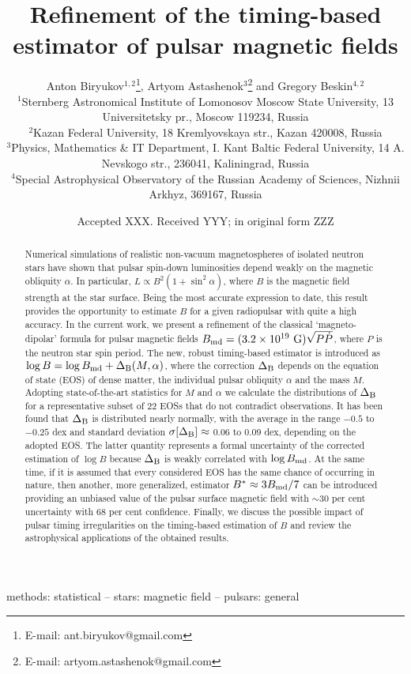 \documentclass[fleqn,usenatbib]{mnras}
\title[Refinement of pulsar magnetic fields]{Refinement of the timing-based estimator of pulsar magnetic fields}
\author[Biryukov, Astashenok \& Beskin]{
Anton Biryukov$^{1,2}$\thanks{E-mail: ant.biryukov@gmail.com},
Artyom Astashenok$^{3}$\thanks{E-mail:
artyom.astashenok@gmail.com} and
Gregory Beskin$^{4,2}$
\\
$^{1}$Sternberg Astronomical Institute of Lomonosov Moscow State University, 13 Universitetsky pr., Moscow 119234, Russia \\
$^{2}$Kazan Federal University, 18 Kremlyovskaya str., Kazan 420008, Russia \\
$^{3}$Physics, Mathematics \& IT Department, I. Kant Baltic Federal University, 14 A. Nevskogo str., 236041, Kaliningrad, Russia\\
$^{4}$Special Astrophysical Observatory of the Russian Academy of Sciences, Nizhnii Arkhyz, 369167, Russia }
\date{Accepted XXX. Received YYY; in original form ZZZ}
\begin{document}
\label{firstpage}
\pagerange{\pageref{firstpage}--\pageref{lastpage}}
\maketitle

\begin{abstract}
Numerical simulations of realistic non-vacuum magnetospheres of isolated neutron stars have
shown that pulsar spin-down luminosities depend weakly on the magnetic obliquity $\alpha$. In
particular, $L \propto B^2(1 + \sin^2\alpha)$, where $B$ is the magnetic field strength at the star surface. Being
the most accurate expression to date, this result provides the opportunity to estimate $B$ for a
given radiopulsar with quite a high accuracy. In the current work, we present a refinement of the
classical `magneto-dipolar' formula for pulsar magnetic fields $B_{\rm md} = (3.2\times 10^{19}\mbox{ G})\sqrt{P\dot P}$,
where $P$ is the neutron star spin period. The new, robust timing-based estimator is introduced as
$\log B = \log B_{\rm md} + \Delta_{\rm B}(M, \alpha)$, where the correction $\Delta_{\rm B}$ depends on the equation of state (EOS)
of dense matter, the individual pulsar obliquity $\alpha$ and the mass $M$. Adopting state-of-the-art
statistics for $M$ and $\alpha$ we calculate the distributions of $\Delta_{\rm B}$ for a representative subset of 22 EOSs
that do not contradict observations. It has been found that $\Delta_{\rm B}$ is distributed nearly normally,
with the average in the range $-0.5$ to $-0.25$ dex and standard deviation $\sigma[\Delta_{\rm B}] \approx$ 0.06 to 0.09 dex, depending on the adopted EOS. The latter quantity represents a formal uncertainty
of the corrected estimation of $\log B$ because $\Delta_{\rm B}$ is weakly correlated with $\log B_{\rm md}$. At the
same time, if it is assumed that every considered EOS has the same chance of occurring in
nature, then another, more generalized, estimator $B^* \approx 3B_{\rm md}/7$ can be introduced providing
an unbiased value of the pulsar surface magnetic field with $\sim$30 per cent uncertainty with
68 per cent confidence. Finally, we discuss the possible impact of pulsar timing irregularities
on the timing-based estimation of $B$ and review the astrophysical applications of the obtained
results.

\end{abstract}

\begin{keywords}
methods: statistical  -- stars: magnetic field  -- pulsars: general
\end{keywords}
\end{document}
